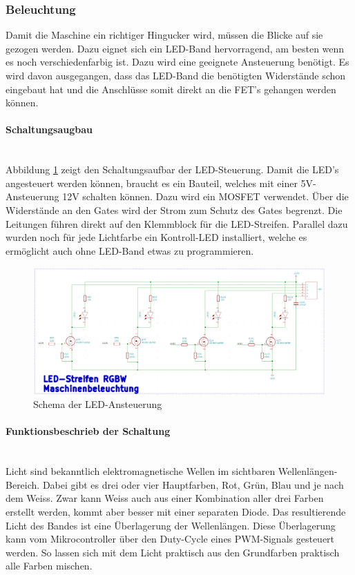 \subsubsection{Beleuchtung}
\label{subsec:Beleuchtung_2}


Damit die Maschine ein richtiger Hingucker wird, müssen die Blicke auf sie gezogen werden. Dazu eignet sich ein LED-Band hervorragend, am besten wenn es noch verschiedenfarbig ist. Dazu wird eine geeignete Ansteuerung benötigt. Es wird davon ausgegangen, dass das LED-Band die benötigten Widerstände schon eingebaut hat und die Anschlüsse somit direkt an die FET's gehangen werden können.

\paragraph{Schaltungsaugbau}\mbox{}\\

Abbildung \ref{fig:Schema_LED} zeigt den Schaltungsaufbar der LED-Steuerung. Damit die LED's angesteuert werden können, braucht es ein Bauteil, welches mit einer 5V-Ansteuerung 12V schalten können. Dazu wird ein MOSFET verwendet. Über die Widerstände an den Gates wird der Strom zum Schutz des Gates begrenzt. Die Leitungen führen direkt auf den Klemmblock für die LED-Streifen. Parallel dazu wurden noch für jede Lichtfarbe ein Kontroll-LED installiert, welche es ermöglicht auch ohne LED-Band etwas zu programmieren.

\begin{figure}[!h]
\center
\includegraphics[width = 0.5 \textwidth]{graphics/Schema_LED}
\caption{Schema der LED-Ansteuerung}
\label{fig:Schema_LED}
\end{figure}

\paragraph{Funktionsbeschrieb der Schaltung}\mbox{}\\

Licht sind bekanntlich elektromagnetische Wellen im sichtbaren Wellenlängen-Bereich. Dabei gibt es drei oder vier Hauptfarben, Rot, Grün, Blau und je nach dem Weiss. Zwar kann Weiss auch aus einer Kombination aller drei Farben erstellt werden, kommt aber besser mit einer separaten Diode. Das resultierende Licht des Bandes ist eine Überlagerung der Wellenlängen. Diese Überlagerung kann vom Mikrocontroller über den Duty-Cycle eines PWM-Signals gesteuert werden. So lassen sich mit dem Licht praktisch aus den Grundfarben praktisch alle Farben mischen.